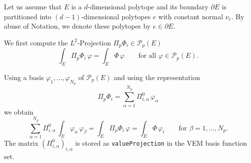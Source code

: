 \documentclass{article}
\begin{document}
Let us assume that $E$ is a $d$-dimensional polytope and its boundary $\partial E$
is partitioned into $(d-1)$-dimensional polytopes $e$ with constant normal $\nu_e$.
By abuse of Notation, we denote these polytopes by $e \in \partial E$.

We first compute the $L^2$-Projection $\Pi_p \Phi_i \in \mathcal{P}_p( E )$
\begin{equation*}
  \int_E \Pi_p \Phi_i\,\varphi = \int_E \Phi\,\varphi
  \qquad\text{for all $\varphi \in \mathcal{P}_p( E )$.}
\end{equation*}

Using a basis $\varphi_1, \ldots, \varphi_{N_p}$ of $\mathcal{P}_p( E )$ and using
the representation
\begin{equation*}
  \Pi_p \Phi_i = \sum_{\alpha=1}^{N_p} \Pi^0_{i,\alpha}\,\varphi_\alpha
\end{equation*}
we obtain
\begin{equation*}
  \sum_{\alpha=1}^{N_p} \Pi^0_{i, \alpha}\,\int_E \varphi_\alpha\,\varphi_\beta
  = \int_E \Pi_p \Phi_i\,\varphi
  = \int_E \Phi\,\varphi_i
  \qquad\text{for $\beta = 1, \ldots, N_p$.}
\end{equation*}
The matrix $(\Pi^0_{i, \alpha})_{i, \alpha}$ is stored as \texttt{valueProjection}
in the VEM basis function set.
\end{document}
